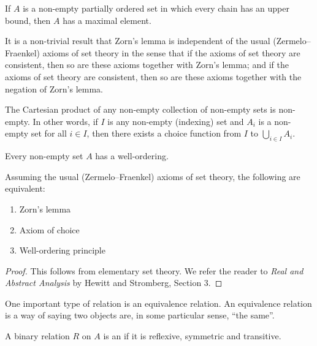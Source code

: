 \begin{lemma}
If $A$ is a non-empty partially ordered set in which every chain has an upper bound, then $A$ has a maximal element.
\end{lemma}

It is a non-trivial result that Zorn's lemma is independent of the usual (Zermelo--Fraenkel) axioms of set theory in the sense that if the axioms of set theory are consistent, then so are these axioms together with Zorn's lemma; and if the axioms of set theory are consistent, then so are these axioms together with the negation of Zorn's lemma.

\begin{lemma}
The Cartesian product of any non-empty collection of non-empty sets is non-empty. In other words, if $I$ is any non-empty (indexing) set and $A_i$ is a non-empty set for all $i\in I$, then there exists a choice function from $I$ to $\bigcup_{i\in I}A_i$.
\end{lemma}

\begin{lemma}
Every non-empty set $A$ has a well-ordering.
\end{lemma}

\begin{theorem}
Assuming the usual (Zermelo--Fraenkel) axioms of set theory, the following are equivalent:
\begin{enumerate}[label=(\roman*)]
\item Zorn's lemma
\item Axiom of choice
\item Well-ordering principle
\end{enumerate}
\end{theorem}

\begin{proof}
This follows from elementary set theory. We refer the reader to \textit{Real and Abstract Analysis} by Hewitt and Stromberg, Section 3.
\end{proof}

One important type of relation is an equivalence relation. An equivalence relation is a way of saying two objects are, in some particular sense, ``the same''.

\begin{definition}
A binary relation $R$ on $A$ is an  if it is reflexive, symmetric and transitive.
\end{definition}

